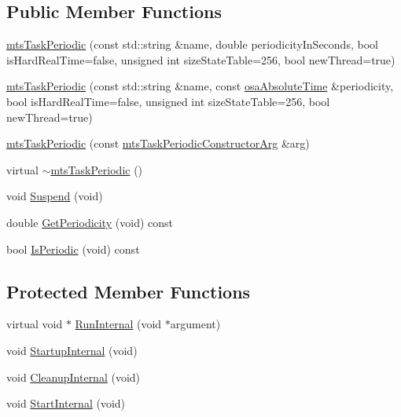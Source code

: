 \subsection*{Public Member Functions}
\begin{DoxyCompactItemize}
\item 
\hyperlink{classmts_task_periodic_a25f41126d8b23b5b5b60d6b6f374bff1}{mts\+Task\+Periodic} (const std\+::string \&name, double periodicity\+In\+Seconds, bool is\+Hard\+Real\+Time=false, unsigned int size\+State\+Table=256, bool new\+Thread=true)
\item 
\hyperlink{classmts_task_periodic_a3489ad68db155dbd1db291c30aafd496}{mts\+Task\+Periodic} (const std\+::string \&name, const \hyperlink{structosa_absolute_time}{osa\+Absolute\+Time} \&periodicity, bool is\+Hard\+Real\+Time=false, unsigned int size\+State\+Table=256, bool new\+Thread=true)
\item 
\hyperlink{classmts_task_periodic_a49faf52b10d7aca0978a61a6cd27b60c}{mts\+Task\+Periodic} (const \hyperlink{classmts_task_periodic_constructor_arg}{mts\+Task\+Periodic\+Constructor\+Arg} \&arg)
\item 
virtual \hyperlink{classmts_task_periodic_a09448e25ee409df689315ab951036b71}{$\sim$mts\+Task\+Periodic} ()
\item 
void \hyperlink{classmts_task_periodic_af3e36d8b4f558dc69e9667ed060828cf}{Suspend} (void)
\item 
double \hyperlink{classmts_task_periodic_ac4a9e6bd9e5eb0b8e54acb4f29d7aebe}{Get\+Periodicity} (void) const 
\item 
bool \hyperlink{classmts_task_periodic_af825cb47ff69d22024981da77ddcf2c2}{Is\+Periodic} (void) const 
\end{DoxyCompactItemize}
\subsection*{Protected Member Functions}
\begin{DoxyCompactItemize}
\item 
virtual void $\ast$ \hyperlink{classmts_task_periodic_aabe3aa8bd8d2b8d3ca488cfbe19a2c63}{Run\+Internal} (void $\ast$argument)
\item 
void \hyperlink{classmts_task_periodic_a18cf3343b3fccacc4966ed1356fad70c}{Startup\+Internal} (void)
\item 
void \hyperlink{classmts_task_periodic_a9c53e006fe135c78d64a71790b9a6000}{Cleanup\+Internal} (void)
\item 
void \hyperlink{classmts_task_periodic_ac593dd5d4352b12308c86b9a8df0c322}{Start\+Internal} (void)
\end{DoxyCompactItemize}
